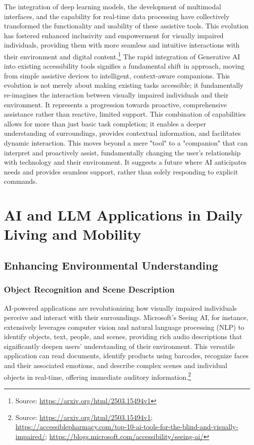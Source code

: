 The integration of deep learning models, the development of multimodal interfaces, and the capability for real-time data processing have collectively transformed the functionality and usability of these assistive tools. This evolution has fostered enhanced inclusivity and empowerment for visually impaired individuals, providing them with more seamless and intuitive interactions with their environment and digital content.\footnote{Source: \url{https://arxiv.org/html/2503.15494v1}} The rapid integration of Generative AI into existing accessibility tools signifies a fundamental shift in approach, moving from simple assistive devices to intelligent, context-aware companions. This evolution is not merely about making existing tasks accessible; it fundamentally re-imagines the interaction between visually impaired individuals and their environment. It represents a progression towards proactive, comprehensive assistance rather than reactive, limited support. This combination of capabilities allows for more than just basic task completion; it enables a deeper understanding of surroundings, provides contextual information, and facilitates dynamic interaction. This moves beyond a mere "tool" to a "companion" that can interpret and proactively assist, fundamentally changing the user's relationship with technology and their environment. It suggests a future where AI anticipates needs and provides seamless support, rather than solely responding to explicit commands.

\section{AI and LLM Applications in Daily Living and Mobility}

\subsection{Enhancing Environmental Understanding}

\subsubsection{Object Recognition and Scene Description}

AI-powered applications are revolutionizing how visually impaired individuals perceive and interact with their surroundings. Microsoft's Seeing AI, for instance, extensively leverages computer vision and natural language processing (NLP) to identify objects, text, people, and scenes, providing rich audio descriptions that significantly deepen users' understanding of their environment. This versatile application can read documents, identify products using barcodes, recognize faces and their associated emotions, and describe complex scenes and individual objects in real-time, offering immediate auditory information.\footnote{Source: \url{https://arxiv.org/html/2503.15494v1}; \url{https://accessiblepharmacy.com/top-10-ai-tools-for-the-blind-and-visually-impaired/}; \url{https://blogs.microsoft.com/accessibility/seeing-ai/}}

